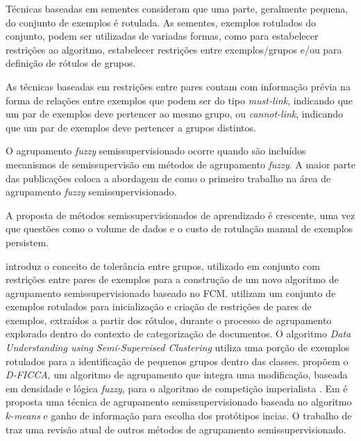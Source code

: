 Técnicas baseadas em sementes \cite{Pedrycz1997,Bensaid1996,Bensaid1998,Labzour1998,Basu2002} consideram que uma parte, geralmente pequena, do conjunto de exemplos é rotulada. As sementes, exemplos rotulados do conjunto, podem ser utilizadas de variadas formas, como para estabelecer restrições ao algoritmo, estabelecer restrições entre exemplos/grupos e/ou para definição de rótulos de grupos.

As técnicas baseadas em restrições entre pares \cite{Wagstaff2001,Basu2004,Grira2005,Grira2008} contam com informação prévia na forma de relações entre exemplos que podem ser do tipo \emph{must-link}, indicando que um par de exemplos deve pertencer ao mesmo grupo, ou \emph{cannot-link}, indicando que um par de exemplos deve pertencer a grupos distintos.

O agrupamento \emph{fuzzy} semissupervisionado ocorre quando são incluídos mecanismos de semissupervisão em métodos de agrupamento \emph{fuzzy}. A maior parte das publicações coloca a abordagem de  como o primeiro trabalho na área de agrupamento \emph{fuzzy} semissupervisionado. 


A proposta de métodos semissupervisionados de aprendizado é crescente, uma vez que questões como o volume de dados e o custo de rotulação manual de exemplos persistem.

 introduz o conceito de tolerância entre grupos, utilizado em conjunto com restrições entre pares de exemplos para a construção de um novo algoritmo de agrupamento semissupervisionado baseado no FCM.  utilizam um conjunto de exemplos rotulados para inicialização e criação de restrições de pares de exemplos, extraídos a partir dos rótulos, durante o processo de agrupamento explorado dentro do contexto de categorização de documentos. O algoritmo \emph{Data Understanding using Semi-Supervised Clustering} \cite{Bhatnagar2012} %
utiliza uma porção de exemplos rotulados para a identificação de pequenos grupos dentro das classes.  propõem o \emph{D-FICCA}, um algoritmo de agrupamento que integra uma modificação, baseada em densidade e lógica \emph{fuzzy}, para o algoritmo de competição imperialista \cite{Atashpaz2007}. Em \cite{Zhenpeng2014} é proposta uma técnica de agrupamento semissupervisionado baseada no algoritmo $k$-\emph{means} e ganho de informação para escolha dos protótipos incias. O trabalho de  traz uma revisão atual de outros métodos de agrupamento semissupervisionado.